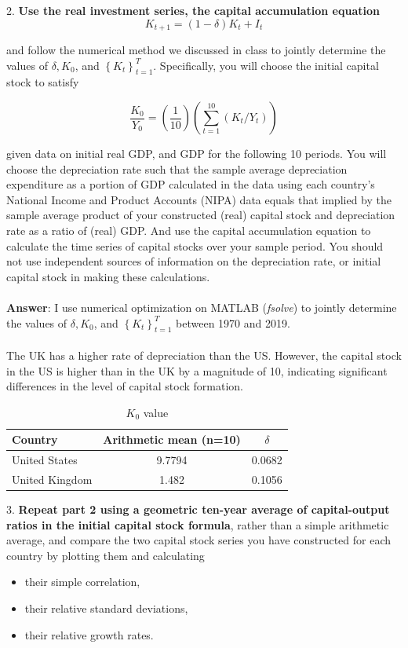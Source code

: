 \documentclass[12pt]{article}
\theoremstyle{mytheoremstyle}
\theoremstyle{mytheoremstyle}
\theoremstyle{myproblemstyle}
\begin{document}

2. \textbf{Use the real investment series, the capital accumulation equation}
$$
K_{t+1}=(1-\delta) K_t+I_t
$$

and follow the numerical method we discussed in class to jointly determine the values of $\delta, K_0$, and $\left\{K_t\right\}_{t=1}^T$. Specifically, you will choose the initial capital stock to satisfy

$$
\frac{K_0}{Y_0}=\left(\frac{1}{10}\right)\left(\sum_{t=1}^{10}\left(K_t / Y_t\right)\right)
$$

\noindent given data on initial real GDP, and GDP for the following 10 periods. You will choose the depreciation rate such that the sample average depreciation expenditure as a portion of GDP calculated in the data using each country's National Income and Product Accounts (NIPA) data equals that implied by the sample average product of your constructed (real) capital stock and depreciation rate as a ratio of (real) GDP. And use the capital accumulation equation to calculate the time series of capital stocks over your sample period. You should not use independent sources of information on the depreciation rate, or initial capital stock in making these calculations.
\\ \\ 
\textbf{Answer}: I use numerical optimization on MATLAB (\textit{fsolve}) to jointly determine the values of $\delta, K_0$, and $\left\{K_t\right\}_{t=1}^T$ between 1970 and 2019. 
\\ \\ 
The UK has a higher rate of depreciation than the US. However, the capital stock in the US is higher than in the UK by a magnitude of 10, indicating significant differences in the level of capital stock formation.

\begin{table}[h]
    \centering
    \caption{$K_0$ value }
    \label{tab:table-1}
    \begin{tabular}{@{}lcc@{}}
    \toprule
    Country & Arithmetic mean (n=10) & $\delta$ \\ \midrule
    United States & 9.7794 & 0.0682 \\
    United Kingdom & 1.482 & 0.1056
    \end{tabular}
    \end{table}

3. \textbf{Repeat part 2 using a geometric ten-year average of capital-output ratios in the initial capital stock formula}, rather than a simple arithmetic average, and compare the two capital stock series you have constructed for each country by plotting them and calculating
\begin{itemize}
    \item their simple correlation,
    \item their relative standard deviations,
    \item their relative growth rates.
\end{itemize}
\end{document}

